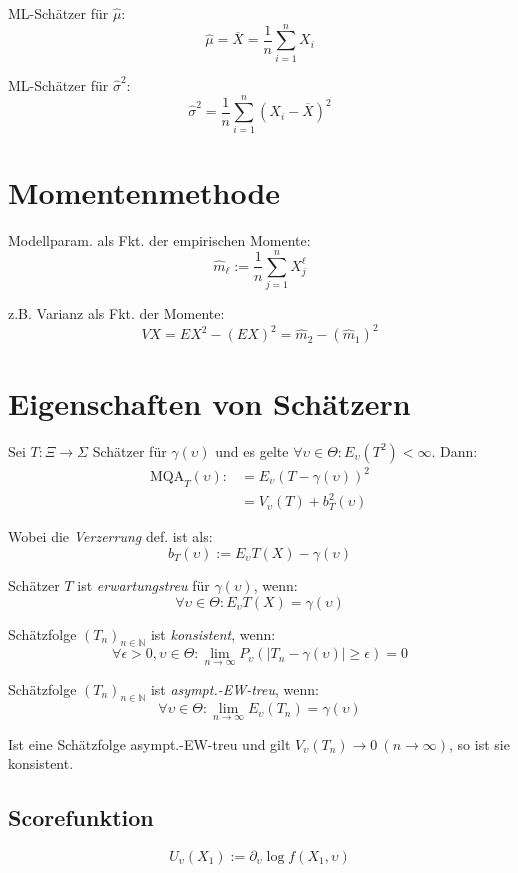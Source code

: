 ML-Schätzer für \(\hat\mu\):
\[ \hat\mu = \overline X = \frac{1}{n}\sum_{i=1}^n X_i \]

ML-Schätzer für \(\hat\sigma^2\):
\[ \hat\sigma^2 = \frac{1}{n}\sum_{i=1}^n (X_i-\overline X)^2 \]

\section*{Momentenmethode}

Modellparam. als Fkt. der empirischen Momente:
\[ \hat m_\ell := \frac{1}{n} \sum_{j=1}^n X_j^\ell \]

z.B. Varianz als Fkt. der Momente:
\[ VX = EX^2 - (EX)^2 = \hat m_2 - (\hat m_1)^2 \]

\section*{Eigenschaften von Schätzern}

Sei \(T : \Xi \to \Sigma\) Schätzer für \(\gamma(\upsilon)\) und es gelte \(\forall \upsilon \in \Theta : E_\upsilon(T^2) < \infty\). Dann:
\begin{align*}
\text{MQA}_T(\upsilon) :&= E_\upsilon(T-\gamma(\upsilon))^2 \\
&= V_\upsilon(T) + b_T^2(\upsilon)
\end{align*}

Wobei die \emph{Verzerrung} def. ist als:
\[ b_T(\upsilon) := E_\upsilon T(X) - \gamma(\upsilon) \]

Schätzer \(T\) ist \emph{erwartungstreu} für \(\gamma(\upsilon)\), wenn:
\[ \forall \upsilon \in \Theta : E_\upsilon T(X) = \gamma(\upsilon) \]

Schätzfolge \((T_n)_{n \in \mathbb{N}}\) ist \emph{konsistent}, wenn:
\[ \forall \epsilon > 0, \upsilon \in \Theta : \lim_{n\to\infty} P_\upsilon(|T_n - \gamma(\upsilon)| \geq \epsilon) = 0 \]

Schätzfolge \((T_n)_{n \in \mathbb{N}}\) ist \emph{asympt.-EW-treu}, wenn:
\[ \forall \upsilon \in \Theta : \lim_{n\to\infty} E_\upsilon(T_n) = \gamma(\upsilon) \]

Ist eine Schätzfolge asympt.-EW-treu und gilt \(V_\upsilon(T_n) \to 0 \ (n\to\infty)\), so ist sie konsistent.

\subsection*{Scorefunktion}

\[U_\upsilon(X_1) := \partial_\upsilon \log f(X_1,\upsilon) \]


